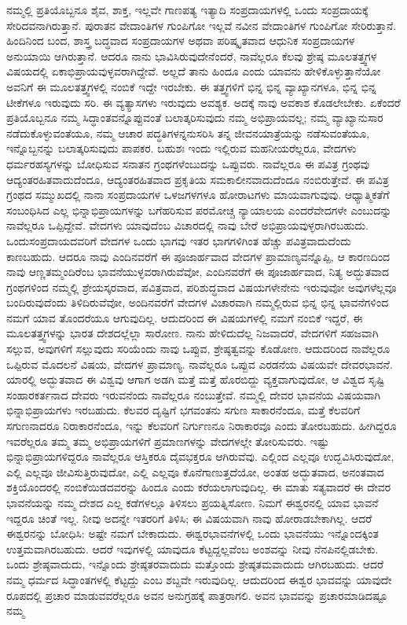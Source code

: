 ನಮ್ಮಲ್ಲಿ ಪ್ರತಿಯೊಬ್ಬನೂ ಶೈವ, ಶಾಕ್ತ, ಇಲ್ಲವೇ ಗಾಣಪತ್ಯ ಇತ್ಯಾದಿ ಸಂಪ್ರದಾಯಗಳಲ್ಲಿ ಒಂದು ಸಂಪ್ರದಾಯಕ್ಕೆ ಸೇರಿದವನಾಗಿರುತ್ತಾನೆ. ಪುರಾತನ ವೇದಾಂತಿಗಳ ಗುಂಪಿಗೋ ಇಲ್ಲವೆ ನವೀನ ವೇದಾಂತಿಗಳ ಗುಂಪಿಗೋ ಸೇರಿರುತ್ತಾನೆ. ಹಿಂದಿನಿಂದ ಬಂದ, ಶಾಸ್ತ್ರ ಬದ್ಧವಾದ ಸಂಪ್ರದಾಯಗಳ ಅಥವಾ ಪರಿಷ್ಕೃತವಾದ ಆಧುನಿಕ ಸಂಪ್ರದಾಯಗಳ ಅನುಯಾಯಿ ಆಗಿರುತ್ತಾನೆ. ಆದರೂ ನಾನು ಭಾವಿಸಿರುವುದೇನೆಂದರೆ, ನಾವೆಲ್ಲರೂ ಕೆಲವು ಶ್ರೇಷ್ಠ ಮೂಲತತ್ತ್ವಗಳ ವಿಷಯದಲ್ಲಿ ಏಕಾಭಿಪ್ರಾಯವುಳ್ಳವರಾಗಿದ್ದೇವೆ. ಅಲ್ಲದೆ ತಾನು ಹಿಂದೂ ಎಂದು ಯಾವನು ಹೇಳಿಕೊಳ್ಳುತ್ತಾನೆಯೋ ಅವನಿಗೆ ಈ ಮೂಲತತ್ತ್ವಗಳಲ್ಲಿ ನಂಬಿಕೆ ಇದ್ದೇ ಇರಬೇಕು. ಈ ತತ್ತ್ವಗಳಿಗೆ ಭಿನ್ನ ಭಿನ್ನ ವ್ಯಾಖ್ಯಾನಗಳೂ, ಭಿನ್ನ ಭಿನ್ನ ಟೀಕೆಗಳೂ ಇರುವುದು ಸರಿ. ಈ ವ್ಯತ್ಯಾಸಗಳು ಇರುವುದು ಅವಶ್ಯಕ. ಅದಕ್ಕೆ ನಾವು ಅವಕಾಶ ಕೊಡಲೇಬೇಕು. ಏಕೆಂದರೆ ಪ್ರತಿಯೊಬ್ಬನೂ ನಮ್ಮ ಸಿದ್ಧಾಂತವನ್ನೊಪ್ಪುವಂತೆ ಬಲಾತ್ಕರಿಸುವುದು ನಮ್ಮ ಅಭಿಪ್ರಾಯವಲ್ಲ; ನಮ್ಮ ವ್ಯಾಖ್ಯಾನುಸಾರ ನಡೆದುಕೊಳ್ಳುವಂತೆಯೂ, ನಮ್ಮ ಆಚಾರ ಪದ್ಧತಿಗಳನ್ನನುಸರಿಸಿ ತನ್ನ ಜೀವನಯಾತ್ರೆಯನ್ನು ನಡೆಸುವಂತೆಯೂ, ಇನ್ನೊಬ್ಬನನ್ನು ಬಲಾತ್ಕರಿಸುವುದು ಪಾಪಕರ. ಬಹುಶಃ ಇಂದು ಇಲ್ಲಿರುವ ಮಹನೀಯರೆಲ್ಲರೂ, ವೇದಗಳು ಧರ್ಮರಹಸ್ಯಗಳನ್ನು ಬೋಧಿಸುವ ಸನಾತನ ಗ್ರಂಥಗಳೆಂಬುದನ್ನು ಒಪ್ಪುವರು. ನಾವೆಲ್ಲರೂ ಈ ಪವಿತ್ರ ಗ್ರಂಥವು ಆದ್ಯಂತರಹಿತವಾದುದೆಂದೂ, ಆದ್ಯಂತರಹಿತವಾದ ಪ್ರಕೃತಿಯ ಸಮಕಾಲೀನವಾದುದೆಂದೂ ನಂಬಿರುತ್ತೇವೆ. ಈ ಪವಿತ್ರ ಗ್ರಂಥದ ಸಮ್ಮುಖದಲ್ಲಿ ನಾನಾ ಸಂಪ್ರದಾಯಗಳ ಒಳಜಗಳಗಳೂ ಹೋರಾಟಗಳು ಮಾಯವಾಗುವುವು. ಆಧ್ಯಾತ್ಮಿಕತೆಗೆ ಸಂಬಂಧಿಸಿದ ಎಲ್ಲ ಭಿನ್ನಾಭಿಪ್ರಾಯಗಳನ್ನು ಬಗೆಹರಿಸುವ ಪರಮೋಚ್ಚ ನ್ಯಾಯಾಲಯ ಎಂದರೆ\break ವೇದಗಳೇ ಎಂಬುದನ್ನು ನಾವೆಲ್ಲರೂ ಒಪ್ಪಿದ್ದೇವೆ. ವೇದಗಳು ಯಾವುದೆಂಬ ವಿಚಾರದಲ್ಲಿ ನಾವು ಬೇರೆ ಅಭಿಪ್ರಾಯವುಳ್ಳರಾಗಿರಬಹುದು. ಒಂದು\break ಸಂಪ್ರದಾಯದವರಿಗೆ ವೇದಗಳ ಒಂದು ಭಾಗವು ಇತರ ಭಾಗಗಳಿಗಿಂತ ಹೆಚ್ಚು ಪವಿತ್ರವಾದುದೆಂದು ಕಾಣಬಹುದು. ಆದರೂ ನಾವು ಎಂದಿನವರೆಗೆ ಈ ಪೂಜಾರ್ಹವಾದ ವೇದಗಳ ಪ್ರಾಮಾಣ್ಯವನ್ನೊಪ್ಪಿ, ಆ ಕಾರಣದಿಂದ ನಾವು ಆಣ್ಣತಮ್ಮಂದಿರೆಂಬ ಭಾವನೆಯುಳ್ಳವರಾಗಿರುವೆವೋ, ಎಂದಿನವರೆಗೆ ಈ ಪೂಜಾರ್ಹವಾದ, ನಿತ್ಯ ಅದ್ಭುತವಾದ ಗ್ರಂಥಗಳಿಂದ ನಮ್ಮಲ್ಲಿ ಶ್ರೇಯಸ್ಕರವಾದ, ಪವಿತ್ರವಾದ, ಪರಿಶುದ್ಧವಾದ ವಿಷಯಗಳೇನೇನು ಇರುವುವೋ ಅವುಗಳೆಲ್ಲವೂ ಬಂದಿರುವುದೆಂದು ತಿಳಿದಿರುವೆವೋ, ಅಂದಿನವರೆಗೆ ವೇದಗಳ ವಿಚಾರವಾಗಿ ನಮ್ಮಲ್ಲಿರುವ ಭಿನ್ನ ಭಿನ್ನ ಭಾವನೆಗಳಿಂದ ನಮಗೆ ಯಾವ ತೊಂದರೆಯೂ ಆಗುವುದಿಲ್ಲ. ಆದುದರಿಂದ ಈ ವಿಷಯಗಳಲ್ಲಿ ನಮಗೆ ನಂಬಿಕೆ ಇದ್ದರೆ, ಈ ಮೂಲತತ್ತ್ವಗಳನ್ನು ಭಾರತ ದೇಶದಲ್ಲೆಲ್ಲಾ ಸಾರೋಣ. ನಾನು ಹೇಳಿದುದೆಲ್ಲ ನಿಜವಾದರೆ, ವೇದಗಳಿಗೆ ಸಹಜವಾಗಿ ಸಲ್ಲುವ, ಅವುಗಳಿಗೆ ಸಲ್ಲುವುದು ಸರಿಯೆಂದು ನಾವು ಒಪ್ಪುವ, ಶ್ರೇಷ್ಠತ್ವವನ್ನು ಕೊಡೋಣ. ಆದುದರಿಂದ ನಾವೆಲ್ಲರೂ ಒಪ್ಪಿರುವ ಮೊದಲನೆ ವಿಷಯ, ವೇದಗಳ ಪ್ರಾಮಾಣ್ಯ. ನಾವೆಲ್ಲರೂ ಒಪ್ಪುವ ಎರಡನೆಯ ವಿಷಯವೇ ದೇವರಭಾವನೆ. ಯಾರಲ್ಲಿ ಅದ್ಭುತವಾದ ಈ ವಿಶ್ವವು ಆಗಾಗ ಅಡಗಿ ಮತ್ತೆ ಮತ್ತೆ ಹೊರಬಿದ್ದು ವ್ಯಕ್ತವಾಗುವುದೋ, ಆ ವಿಶ್ವದ ಸೃಷ್ಟಿ ಸಂಹಾರಕರ್ತನಾದ ದೇವರು ಇರುವನೆಂದು ನಾವೆಲ್ಲರೂ ನಂಬುತ್ತೇವೆ. ನಮ್ಮಲ್ಲಿ ದೇವರ ಭಾವನೆಯ ವಿಷಯವಾಗಿ ಭಿನ್ನಾಭಿಪ್ರಾಯಗಳು ಇರಬಹುದು. ಕೆಲವರ ದೃಷ್ಟಿಗೆ ಭಗವಂತನು ಸಗುಣ ಸಾಕಾರನೆಂದೂ, ಮತ್ತೆ ಕೆಲವರಿಗೆ ಸಗುಣನಾದರೂ ನಿರಾಕಾರನೆಂದೂ, ಇನ್ನು ಕೆಲವರಿಗೆ ನಿರ್ಗುಣನೂ ನಿರಾಕಾರವೂ ಎಂದು ತೋರಬಹುದು. ಹೀಗಿದ್ದರೂ ಇವರೆಲ್ಲರೂ ತಮ್ಮ ತಮ್ಮ ಅಭಿಪ್ರಾಯಗಳಿಗೆ ಪ್ರಮಾಣಗಳನ್ನು ವೇದಗಳಲ್ಲೇ ತೋರಿಸುವರು. ಇಷ್ಟು ಭಿನ್ನಾಭಿಪ್ರಾಯಗಳಿದ್ದರೂ ನಾವೆಲ್ಲರೂ ಆಸ್ತಿಕರೂ ದೈವಭಕ್ತರೂ ಆಗಿರುವೆವು. ಎಲ್ಲಿಂದ ಎಲ್ಲವೂ ಉದ್ಭವಿಸಿರುವುದೋ, ಎಲ್ಲಿ ಎಲ್ಲವೂ ಜೀವಿಸುತ್ತಿರುವುದೋ, ಎಲ್ಲಿ ಎಲ್ಲವೂ ಕೊನೆಗಾಣುತ್ತದೆಯೋ, ಅಂತಹ ಅದ್ಭುತವಾದ, ಅನಂತವಾದ ಶಕ್ತಿಯೊಂದರಲ್ಲಿ ನಂಬಿಕೆಯಿಡದವರನ್ನು ಹಿಂದೂ ಎಂದು ಕರೆಯಲಾಗುವುದಿಲ್ಲ. ಈ ಮಾತು ಸತ್ಯವಾದರೆ ಈ ದೇವರ ಭಾವನೆಯನ್ನು ನಮ್ಮ ದೇಶದ ಎಲ್ಲ ಕಡೆಗಳಲ್ಲೂ ತಿಳಿಸಲು ಪ್ರಯತ್ನಿಸೋಣ. ನಿಮಗೆ ಈಶ್ವರನಲ್ಲಿ ಯಾವ ಭಾವನೆ ಇದ್ದರೂ ಚಿಂತೆ ಇಲ್ಲ. ನೀವು ಅದನ್ನೇ ಇತರರಿಗೆ ತಿಳಿಸಿ; ಈ ವಿಷಯವಾಗಿ ನಾವು ಹೋರಾಡಬೇಕಾಗಿಲ್ಲ. ಆದರೆ ಈಶ್ವರನನ್ನು ಬೋಧಿಸಿ: ಅಷ್ಟೇ ನಮಗೆ ಬೇಕಾದುದು. ಈಶ್ವರ\break ಭಾವನೆಗಳಲ್ಲಿ ಒಂದು ಭಾವನೆಯು ಇನ್ನೊಂದಕ್ಕಿಂತ ಉತ್ತಮವಾಗಿರಬಹುದು. ಆದರೆ ಇವುಗಳಲ್ಲಿ ಯಾವುದೂ ಕೆಟ್ಟದ್ದಲ್ಲವೆಂಬ ಅಂಶವನ್ನು ನೀವು ನೆನಪಿನಲ್ಲಿಡಬೇಕು. ಒಂದು ಶ್ರೇಷ್ಠವಾದುದು, ಇನ್ನೊಂದು ಶ್ರೇಷ್ಠತರವಾದುದು ಮತ್ತೊಂದು ಶ್ರೇಷ್ಠತಮವಾದುದು ಆಗಿರಬಹುದು. ಆದರೆ ನಮ್ಮ ಧರ್ಮದ ಸಿದ್ಧಾಂತಗಳಲ್ಲಿ ಕೆಟ್ಟದ್ದು ಎಂಬ ಶಬ್ದವೇ ಇರುವುದಿಲ್ಲ. ಆದುದರಿಂದ ಈಶ್ವರ ಭಾವವನ್ನು ಯಾವುದೇ ರೂಪದಲ್ಲಿ ಪ್ರಚಾರ ಮಾಡುವವರೆಲ್ಲರೂ ಅವನ ಅನುಗ್ರಹಕ್ಕೆ ಪಾತ್ರರಾಗಲಿ. ಅವನ ಭಾವವನ್ನು ಪ್ರಚಾರಮಾಡಿದಷ್ಟೂ ನಮ್ಮ 